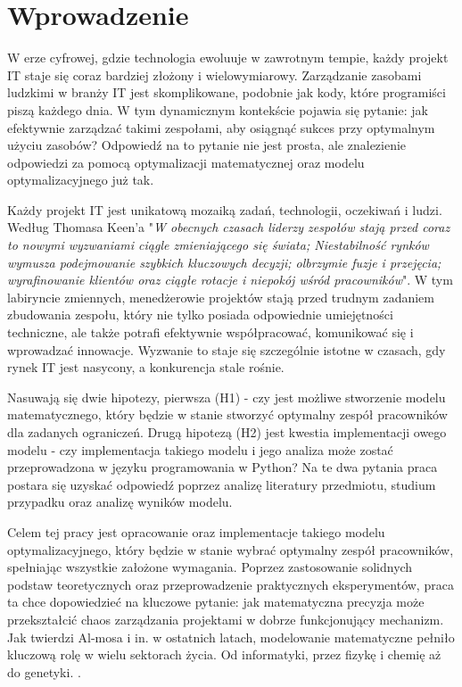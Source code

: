 \chapter*{Wprowadzenie}

\par W erze cyfrowej, gdzie technologia ewoluuje w zawrotnym tempie, każdy projekt IT staje się coraz bardziej złożony i wielowymiarowy. Zarządzanie zasobami ludzkimi w branży IT jest skomplikowane, podobnie jak kody, które programiści piszą każdego dnia. W tym dynamicznym kontekście pojawia się pytanie: jak efektywnie zarządzać takimi zespołami, aby osiągnąć sukces przy optymalnym użyciu zasobów? Odpowiedź na to pytanie nie jest prosta, ale znalezienie odpowiedzi za pomocą optymalizacji matematycznej oraz modelu optymalizacyjnego już tak.

\par Każdy projekt IT jest unikatową mozaiką zadań, technologii, oczekiwań i ludzi. Według Thomasa Keen'a \parencite{keen2003creating} "\textit{W obecnych czasach liderzy zespołów stają przed coraz to nowymi wyzwaniami ciągle zmieniającego się świata; Niestabilność rynków wymusza podejmowanie szybkich kluczowych decyzji; olbrzymie fuzje i przejęcia; wyrafinowanie klientów oraz ciągłe rotacje i niepokój wśród pracowników}". W tym labiryncie zmiennych, menedżerowie projektów stają przed trudnym zadaniem zbudowania zespołu, który nie tylko posiada odpowiednie umiejętności techniczne, ale także potrafi efektywnie współpracować, komunikować się i wprowadzać innowacje. Wyzwanie to staje się szczególnie istotne w czasach, gdy rynek IT jest nasycony, a konkurencja stale rośnie. 

\par\label{par:hipotezy} Nasuwają się dwie hipotezy, pierwsza (H1) - czy jest możliwe stworzenie modelu matematycznego, który będzie w stanie stworzyć optymalny zespół pracowników dla zadanych ograniczeń. Drugą hipotezą (H2) jest kwestia implementacji owego modelu - czy implementacja takiego modelu i jego analiza może zostać przeprowadzona w języku programowania w Python? Na te dwa pytania praca postara się uzyskać odpowiedź poprzez analizę literatury przedmiotu, studium przypadku oraz analizę wyników modelu.

\par Celem tej pracy jest opracowanie oraz implementacje takiego modelu optymalizacyjnego, który będzie w stanie wybrać optymalny zespół pracowników, spełniając wszystkie założone wymagania. Poprzez zastosowanie solidnych podstaw teoretycznych oraz przeprowadzenie praktycznych eksperymentów, praca ta chce dopowiedzieć na kluczowe pytanie: jak matematyczna precyzja może przekształcić chaos zarządzania projektami w dobrze funkcjonujący mechanizm. Jak twierdzi Al-mosa i in. w ostatnich latach, modelowanie matematyczne pełniło kluczową rolę w wielu sektorach życia. Od informatyki, przez fizykę i chemię aż do genetyki. \parencite{almosa2023python}.

